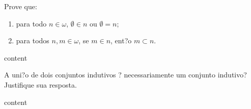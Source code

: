 \begin{exercicio}
	Prove que:
	\begin{enumerate}[label=(\alph{*})]
		\item para todo $n\in\omega$, $\emptyset\in n$ ou $\emptyset=n$;
		\item para todos $n,m\in\omega$, se $m\in n$, ent?o $m\subset n$.
	\end{enumerate}
\end{exercicio}
\begin{solucao}
	content
\end{solucao}

\begin{exercicio}
	A uni?o de dois conjuntos indutivos ? necessariamente um conjunto indutivo? Justifique sua resposta.
\end{exercicio}
\begin{solucao}
	content
\end{solucao}